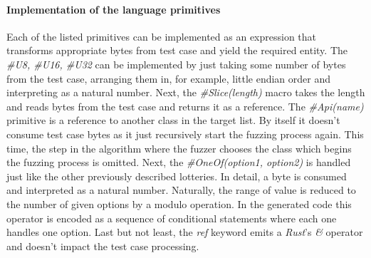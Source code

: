 \paragraph{Implementation of the language primitives}
Each of the listed primitives can be implemented as an expression that transforms appropriate bytes from test case and yield the required entity. The \textit{\#U8, \#U16, \#U32} can be implemented by just taking some number of bytes from the test case, arranging them in, for example, little endian order and interpreting as a natural number. Next, the \textit{\#Slice(length)} macro takes the length and reads bytes from the test case and returns it as a reference. The \textit{\#Api(name)} primitive is a reference to another class in the target list. By itself it doesn't consume test case bytes as it just recursively start the fuzzing process again. This time, the step in the algorithm where the fuzzer chooses the class which begins the fuzzing process is omitted. Next, the \textit{\#OneOf(option1, option2)} is handled just like the other previously described lotteries. In detail, a byte is consumed and interpreted as a natural number. Naturally, the range of value is reduced to the number of given options by a modulo operation. In the generated code this operator is encoded as a sequence of conditional statements where each one handles one option. Last but not least, the \textit{ref} keyword emits a \textit{Rust}'s \textit{\&} operator and doesn't impact the test case processing.

